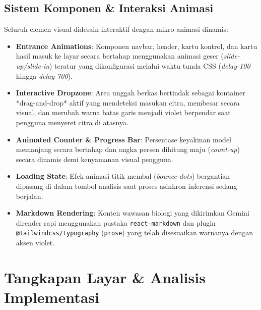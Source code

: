 \documentclass[12pt, a4paper]{article}
\begin{document}
\subsection{Sistem Komponen & Interaksi Animasi}
Seluruh elemen visual didesain interaktif dengan mikro-animasi dinamis:
\begin{itemize}
    \item \textbf{Entrance Animations}: Komponen navbar, header, kartu kontrol, dan kartu hasil masuk ke layar secara bertahap menggunakan animasi geser (\textit{slide-up/slide-in}) teratur yang dikonfigurasi melalui waktu tunda CSS (\textit{delay-100} hingga \textit{delay-700}).
    \item \textbf{Interactive Dropzone}: Area unggah berkas bertindak sebagai kontainer *drag-and-drop* aktif yang mendeteksi masukan citra, membesar secara visual, dan merubah warna batas garis menjadi violet berpendar saat pengguna menyeret citra di atasnya.
    \item \textbf{Animated Counter & Progress Bar}: Persentase keyakinan model memanjang secara bertahap dan angka persen dihitung maju (\textit{count-up}) secara dinamis demi kenyamanan visual pengguna.
    \item \textbf{Loading State}: Efek animasi titik membal (\textit{bounce-dots}) bergantian dipasang di dalam tombol analisis saat proses asinkron inferensi sedang berjalan.
    \item \textbf{Markdown Rendering}: Konten wawasan biologi yang dikirimkan Gemini dirender rapi menggunakan pustaka \texttt{react-markdown} dan plugin \texttt{@tailwindcss/typography} (\texttt{prose}) yang telah disesuaikan warnanya dengan aksen violet.
\end{itemize}

\newpage
\section{Tangkapan Layar \& Analisis Implementasi}
\end{document}
